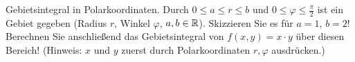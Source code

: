 \item Gebietsintegral in Polarkoordinaten. Durch $0 \le a \le r \le b$ und $0 \le \varphi \le \frac{\pi}{2}$ ist ein Gebiet gegeben (Radius $r$, Winkel $\varphi$, $a,b\in\mathbb{R}$). Skizzieren Sie es für $a=1$, $b=2$! Berechnen Sie anschließend das Gebietsintegral von $f(x,y)=x\cdot y$ über diesen Bereich! (Hinweis: $x$ und $y$ zuerst durch Polarkoordinaten $r,\varphi$ ausdrücken.)
